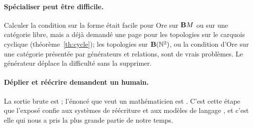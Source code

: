 \paragraph{Spécialiser peut être difficile.} Calculer la condition sur la forme était facile pour Ore sur $\mathbf{B} M$ ou sur une catégorie libre, mais a déjà demandé une page pour les topologies sur le carquois cyclique (théorème~\ref{th:cycle}); les topologies sur $\mathbf{B}(\mathbb N^2)$, ou la condition d'Ore sur une catégorie présentée par générateurs et relations, sont de vrais problèmes. Le générateur déplace la difficulté sans la supprimer.

\paragraph{Déplier et réécrire demandent un humain.} La sortie brute est ; l'énoncé que veut un mathématicien est . C'est cette étape que l'exposé confie aux systèmes de réécriture et aux modèles de langage \cite[transparent 17]{caramello-mines}, et c'est elle qui nous a pris la plus grande partie de notre temps.

